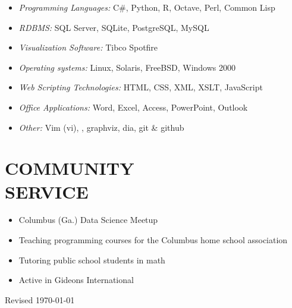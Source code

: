 \documentclass[margin, 10pt]{res} %
\begin{document}
\begin{resume}
\begin{itemize}
\item {\it Programming Languages:} C\#, Python,  \textsf{R},  Octave, Perl, Common Lisp
\item {\it RDBMS:} SQL Server, SQLite, PostgreSQL, MySQL 
\item {\it Visualization Software:} Tibco Spotfire
\item {\it Operating systems:} Linux, Solaris, FreeBSD, Windows 2000
\item {\it Web Scripting Technologies:} HTML, CSS, XML, XSLT, JavaScript
\item {\it Office Applications:} Word, Excel, Access, PowerPoint, Outlook
\item {\it Other:} Vim (vi), \LaTeXe, graphviz, dia, git \& github
\end{itemize}

 


\section{COMMUNITY \\ SERVICE}

\begin{itemize} \itemsep -2pt %
    \item Columbus (Ga.) Data Science Meetup
    \item Teaching programming courses for the Columbus home school association
    \item Tutoring public school students in math
    \item Active in Gideons International
\end{itemize}

\vspace*{\fill}
\tiny{Revised \today}


\end{resume}
\end{document}
